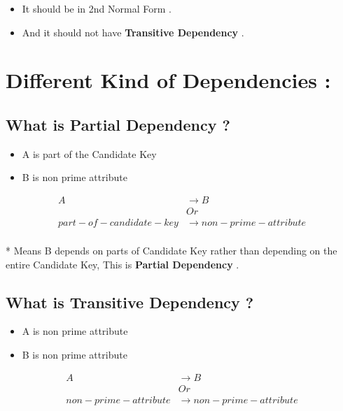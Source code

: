 \documentclass[10pt]{article}
\begin{document}
\begin{itemize}
	\item It should be in 2nd Normal Form .
	\item And it should not have \textbf{Transitive Dependency} .
\end{itemize}



\section{Different Kind of Dependencies :}


\subsection{What is Partial Dependency ?}

\begin{itemize}
	\item A is part of the Candidate Key
	\item B is non prime attribute 
\end{itemize}

\begin{align*}
A &\to B \\
&Or \\
part-of-candidate-key &\to non-prime-attribute \\
\end{align*}


* Means B depends on parts of Candidate Key rather than depending on the entire Candidate Key, This is \textbf{Partial Dependency} .




\subsection{What is Transitive Dependency ?}

\begin{itemize}
	\item A is non prime attribute 
	\item B is non prime attribute 
\end{itemize}


\begin{align*}
A &\to B \\
&Or \\
non-prime-attribute &\to non-prime-attribute \\
\end{align*}
\end{document}
